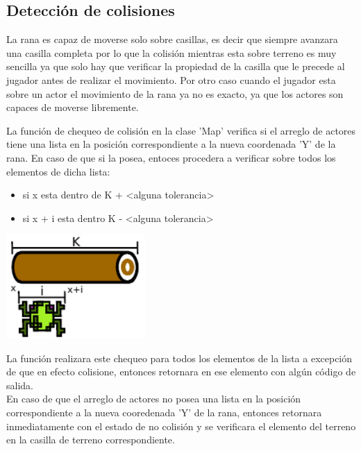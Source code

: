 \documentclass[letter, 12pt] {article}
\begin{document}
\subsection* {Detección de colisiones}
La rana es capaz de moverse solo sobre casillas, es decir que siempre
avanzara una casilla completa por lo que la colisión mientras esta 
sobre terreno es muy sencilla ya que solo hay que verificar la 
propiedad de la casilla que le precede al jugador antes de realizar
el movimiento. Por otro caso cuando el jugador esta sobre un actor
el movimiento de la rana ya no es exacto, ya que los actores son
capaces de moverse libremente.\\

\newpage   %

La función de chequeo de colisión en la clase 'Map' verifica si
el arreglo de actores tiene una lista en la posición correspondiente 
a la nueva coordenada 'Y' de la rana. En caso de que si la posea, 
entoces procedera a verificar sobre todos los elementos de dicha lista:
\begin {itemize}
  \item si x esta dentro de K + <alguna tolerancia>\\ 
  \item si x + i esta dentro K - <alguna tolerancia>\\
\end {itemize}

\begin {center}
  \includegraphics[width=200px]{./img/collision.pdf}\\[.5cm]
\end {center}
La función realizara este chequeo para todos los elementos de la
lista a excepción de que en efecto colisione, entonces retornara en
ese elemento con algún código de salida. \\

En caso de que el arreglo de actores no posea una lista en la 
posición correspondiente a la nueva cooredenada 'Y' de la rana, 
entonces retornara inmediatamente con el estado de no colisión
y se verificara el elemento del terreno en la casilla de terreno
correspondiente. \\
\end{document}
